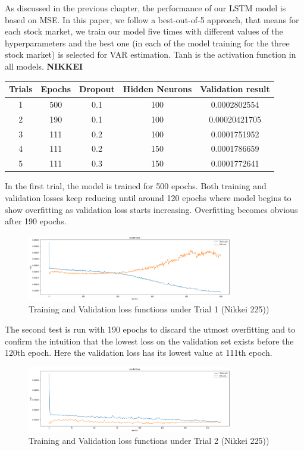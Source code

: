 \documentclass[a4paper,11pt,oneside]{book}
\begin{document}
As discussed in the previous chapter, the performance of our LSTM model is based on MSE. In this paper, we follow a best-out-of-5 approach, that means for each stock market, we train our model five times with different values of the hyperparameters and the best one (in each of the model training for the three stock market) is selected for VAR estimation. Tanh is the activation function in all models.\newline
\textbf{NIKKEI}\newline


\begin{center}
	\begin{tabular}{||c c c c c||} 
		\hline
		Trials & Epochs & Dropout & Hidden Neurons & Validation result\\ [0.5ex] 
		\hline\hline
		1 & 500 & 0.1 & 100 & 0.0002802554 \\ 
		\hline
		2 & 190 & 0.1 & 100 & 0.00020421705 \\
		\hline
		3 & 111 & 0.2 & 100 & 0.0001751952 \\
		\hline
		4 & 111 & 0.2 & 150 & 0.0001786659 \\
		\hline
		5 & 111 & 0.3 & 150 & 0.0001772641\\ [1ex] 
		\hline
	\end{tabular}
\end{center}

In the first trial, the model is trained for 500 epochs. Both training and validation losses keep reducing until around 120 epochs where model begins to show overfitting as validation loss starts increasing. Overfitting becomes obvious after 190 epochs.\newline
\begin{figure}[!h]
	\centering
	\includegraphics[width=0.8\textwidth]{figures/Nik1}
	\caption{Training and Validation loss functions under Trial 1 (Nikkei 225))}
	\label{Nik1}
\end{figure}


 The second test is run with 190 epochs to discard the utmost overfitting and to confirm the intuition that the lowest loss on the validation set exists
 before the 120th epoch. Here the validation loss has its lowest value at 111th epoch. 
\begin{figure}[!h]
	\centering
	\includegraphics[width=0.8\textwidth]{figures/Nik2}
	\caption{Training and Validation loss functions under Trial 2 (Nikkei 225))}
	\label{Nik2}
\end{figure}
\end{document}
